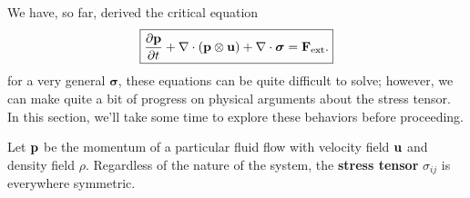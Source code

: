 We have, so far, derived the critical equation
\[
\boxed{
\frac{\partial {\bf p}}{\partial t} + \nabla \cdot ({\bf p} \otimes {\bf u}) + \nabla \cdot \boldsymbol{\sigma} = {\bf F}_{\rm ext}.}
\]
for a very general $\boldsymbol{\sigma}$, these equations can be quite difficult to solve; however, we can make quite a bit of progress on physical arguments about the stress tensor. In this section, we'll take some time to explore these behaviors before proceeding.
\vspace{0.25cm}
\begin{theorem}
\label{thrm:stress-is-symmetric}
Let ${\bf p}$ be the momentum of a particular fluid flow with velocity field ${\bf u}$ and density field $\rho$. Regardless of the nature of the system, the \textbf{stress tensor} $\sigma_{ij}$ is everywhere symmetric.
\end{theorem}
